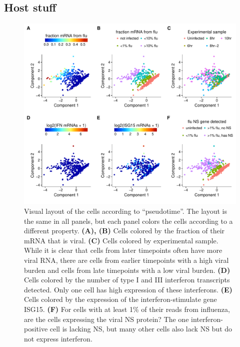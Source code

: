 \documentclass[9pt,lineno]{elife}
\begin{document}
\subsection{Host stuff}

\begin{figure}
\includegraphics[width=\linewidth]{figures/p_pseudo_merge.pdf}
\caption{
Visual layout of the cells according to ``pseudotime''.
The layout is the same in all panels, but each panel colors the cells according to a different property.
{\bf (A), (B)}
Cells colored by the fraction of their mRNA that is viral.
{\bf (C)}
Cells colored by experimental sample.
While it is clear that cells from later timepoints often have more viral RNA, there are cells from earlier timepoints with a high viral burden and cells from late timepoints with a low viral burden.
{\bf (D)}
Cells colored by the number of type I and III interferon transcripts detected.
Only one cell has high expression of these interferons.
{\bf (E)}
Cells colored by the expression of the interferon-stimulate gene ISG15.
{\bf (F)}
For cells with at least 1\% of their reads from influenza, are the cells expressing the viral NS protein?
The one interferon-positive cell is lacking NS, but many other cells also lack NS but do not express interferon.
}
\label{fig:pseudotime}
\end{figure}
\end{document}

